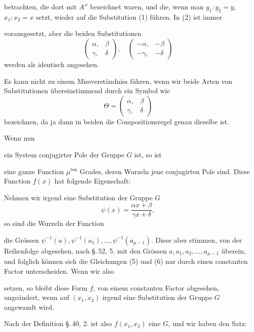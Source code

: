 betrachten, die dort mit $A''$ bezeichnet waren, und die, wenn man
$y_1 : y_2 = y$, $x_1 : x_2 = x$ setzt, wieder auf die Substitution (1)
führen. In (2) ist immer


vorausgesetzt, aber die beiden Substitutionen
\[
\begin{pmatrix}\alpha, & \beta \\ \gamma, & \delta\end{pmatrix}, \quad
\begin{pmatrix}-\alpha, & -\beta \\ -\gamma, & -\delta\end{pmatrix}
\]
werden als identisch angesehen.

Es kann nicht zu einem Missverständniss führen, wenn wir
beide Arten von Substitutionen übereinstimmend durch ein
Symbol wie
\[
\Theta = \begin{pmatrix}\alpha, & \beta \\ \gamma, & \delta\end{pmatrix}
\]
bezeichnen, da ja dann in beiden die Compositionsregel genau
dieselbe ist.

Wenn nun


ein System conjugirter Pole der Gruppe $G$ ist, so ist


eine ganze Function $\mu^{\text{ten}}$ Grades, deren Wurzeln jene conjugirten
Pole sind. Diese Function $f(x)$ hat folgende Eigenschaft:

Nehmen wir irgend eine Substitution der Gruppe $G$
\[
\psi(x) = \frac{\alpha x + \beta}{\gamma x + \delta},
\]
so sind die Wurzeln der Function


die Grössen $\psi^{-1}(a), \psi^{-1}(a_1), \ldots, \psi^{-1}(a_{\mu-1})$. Diese aber stimmen,
von der Reihenfolge abgesehen, nach \S.\,52, 5. mit den
Grössen $a, a_1, a_2, \ldots, a_{\mu-1}$ überein, und folglich können sich die
Gleichungen (5) und (6) nur durch einen constanten Factor
unterscheiden. Wenn wir also


setzen, so bleibt diese Form $f$, von einem constanten Factor abgesehen,
ungeändert, wenn auf $(x_1, x_2)$ irgend eine Substitution
der Gruppe $G$ angewandt wird.

Nach der Definition \S.\,40, 2. ist also $f(x_1, x_2)$ eine
 $G$, und wir haben den Satz:
